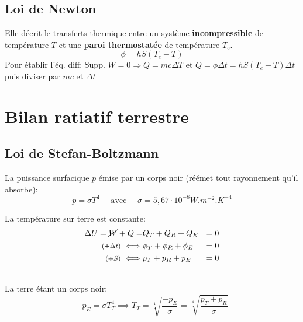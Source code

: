 \documentclass[a5paper,10pt]{article}
\begin{document}
\subsection{Loi de Newton}


Elle décrit le transferts thermique entre un système \textbf{incompressible} de température $T$ et une \textbf{paroi thermostatée} de température $T_e$.
    {\setlength{\abovedisplayskip}{3pt}\setlength{\belowdisplayskip}{3pt}$$\phi = hS(T_e-T)$$}
    {\footnotesize Pour établir l'éq. diff: Supp. $W=0 \Rightarrow Q=mc\Delta T$ et $Q=\phi\Delta t=hS(T_e-T)\Delta t$ puis diviser par $mc$ et $\Delta t$\pagebreak}

\section{Bilan ratiatif terrestre}
\subsection{Loi de Stefan-Boltzmann}
La puissance surfacique $p$ émise par un corps noir (réémet tout rayonnement qu'il absorbe):
$$p=\sigma T^4 \quad \text{ avec } \quad\sigma=5,67\cdot 10^{-8}W.m^{-2}.K^{-4}$$
\begin{minipage}[t]{0.55\linewidth}
    La température sur terre est constante:
    $$\begin{aligned}
            \Delta U=\cancel{W}+Q =                  & Q_T+Q_R+Q_E          & = 0 \\
            \text{\footnotesize$(\div\Delta t)$}\iff & \phi_T+\phi_R+\phi_E & = 0 \\
            \text{\footnotesize$(\div S)$}\iff       & p_T+p_R+p_E          & = 0
        \end{aligned}$$
\end{minipage}
\begin{minipage}[t]{0.4\linewidth}
    \vspace*{0pt}
\end{minipage}
\\[6pt]La terre étant un corps noir:
$$-p_E=\sigma T_T^4 \implies T_T=\sqrt[4]{\frac{-p_E}{\sigma}}=\sqrt[4]{\frac{p_T+p_R}{\sigma}}$$
\end{document}
